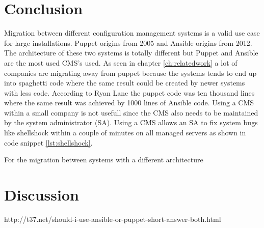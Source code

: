 \section{Conclusion}\label{sec:conclusion}
Migration between different configuration management systems is a valid use case for large installations. Puppet origins from 2005 and Ansible origins from 2012. The architecture of these two systems is totally different but Puppet and Ansible are the most used CMS's used. As seen in chapter \ref{ch:relatedwork} a lot of companies are migrating away from puppet because the systems tends to end up into spaghetti code \cite{movingawayfrompuppet} where the same result could be created by newer systems with less code. According to Ryan Lane \cite{movingawayfrompuppet} the puppet code was ten thousand lines where the same result was achieved by 1000 lines of Ansible code. Using a CMS within a small company is not usefull since the CMS also needs to be maintained by the system administrator (SA). Using a CMS allows an SA to fix system bugs like shellshock within a couple of minutes on all managed servers as shown in code snippet \ref{lst:shellshock}.

For the migration between systems with a different architecture


\section{Discussion}\label{sec:discussion}
http://t37.net/should-i-use-ansible-or-puppet-short-answer-both.html

